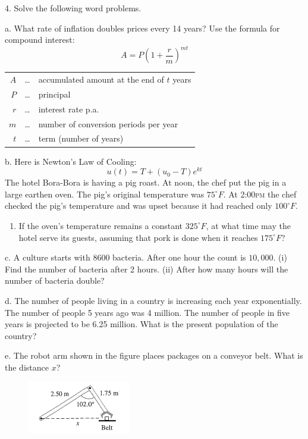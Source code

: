 \documentclass[11pt]{article}
\begin{document}
4. Solve the following word problems.

a. What rate of inflation doubles prices every 14 years? Use the
formula for compound interest:
\begin{equation}
  \label{eq:quahphia}
    A=P\left(1+\frac{r}{m}\right)^{mt}
\end{equation}
\begin{tabular}{rcl}
  $A$&\ldots&accumulated amount at the end of $t$ years \\
  $P$&\ldots&principal \\
  $r$&\ldots&interest rate p.a. \\
  $m$&\ldots&number of conversion periods per year \\
  $t$&\ldots&term (number of years)
\end{tabular}

b. Here is Newton's Law of Cooling:
\begin{equation}
  \label{eq:iemahbec}
  u(t)=T+(u_{0}-T)e^{kt}
\end{equation}
The hotel Bora-Bora is having a pig roast. At noon, the chef put the
pig in a large earthen oven. The pig's original temperature was
$75^{\circ}F$. At 2:00\textsc{pm} the chef checked the pig's
temperature and was upset because it had reached only $100^{\circ}F$.
\begin{enumerate}
\item If the oven's temperature remains a constant $325^{\circ}F$, at
  what time may the hotel serve its guests, assuming that pork is done
  when it reaches $175^{\circ}F$?
\end{enumerate}

c. A culture starts with 8600 bacteria. After one hour the count is
$10,000$. (i) Find the number of bacteria after 2 hours. (ii) After
how many hours will the number of bacteria double?

d. The number of people living in a country is increasing each year
exponentially. The number of people 5 years ago was 4 million. The
number of people in five years is projected to be 6.25 million. What
is the present population of the country?

e. The robot arm shown in the figure places packages on a conveyor
belt. What is the distance $x$?

\begin{figure}[h]
   \includegraphics[scale=.3]{./tri-01.png}
\end{figure}
\end{document}
